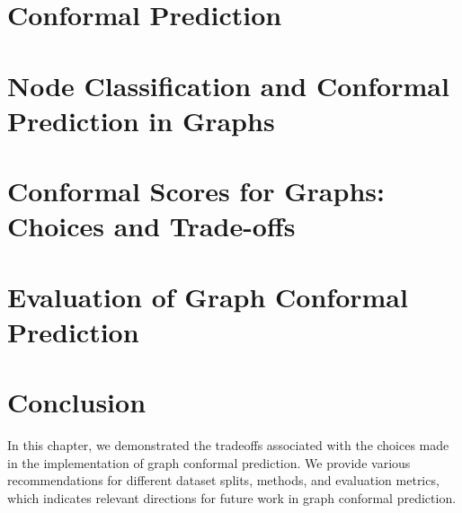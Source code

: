\section{Conformal Prediction}



\section{Node Classification and Conformal Prediction in Graphs}


\section{Conformal Scores for Graphs: Choices and Trade-offs}
\label{chp:graphConformal:sec:conformal_scores_tradeoffs}


\section{Evaluation of Graph Conformal Prediction}


\section{Conclusion}
In this chapter, we demonstrated the tradeoffs associated with the choices made in the implementation of graph conformal prediction.
We provide various recommendations for different dataset splits, methods, and evaluation metrics, which indicates relevant directions for future work in graph conformal prediction.

\begin{subappendices}
    
\end{subappendices}
